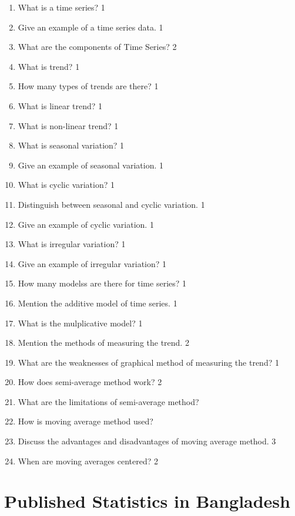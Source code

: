 \documentclass[a4paper,oneside]{book}
\begin{document}
  \begin{enumerate}
    \item What is a time series? \hfill 1
    \item Give an example of a time series data. \hfill 1
    \item What are the components of Time Series?  \hfill 2
    \item What is trend?  \hfill 1
    \item How many types of trends are there? \hfill 1
    \item What is linear trend?  \hfill 1
    \item What is non-linear trend? \hfill 1
    \item What is seasonal variation? \hfill 1
    \item Give an example of seasonal variation. \hfill 1
    \item What is cyclic variation?  \hfill 1
    \item Distinguish between seasonal and cyclic variation. \hfill 1
    \item Give an example of cyclic variation. \hfill 1
    \item What is irregular variation? \hfill 1
    \item Give an example of irregular variation? \hfill 1
    \item How many modelss are there for time series? \hfill 1
    \item Mention the additive model of time series. \hfill 1
    \item What is the mulplicative model? \hfill 1
    \item Mention the methods of measuring the trend. \hfill 2
    \item What are the weaknesses of graphical method of measuring the trend? \hfill 1
    \item How does semi-average method work? \hfill 2
    \item What are the limitations of semi-average method?
    \item How is moving average method used?
    \item Discuss the advantages and disadvantages of moving average method. \hfill 3
    \item When are moving averages centered? \hfill 2
    
     \end{enumerate}

\chapter{Published Statistics in Bangladesh} 
\end{document}
